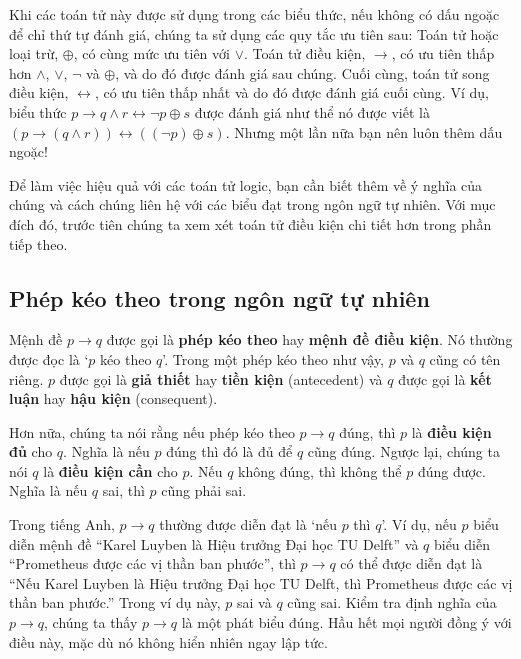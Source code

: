 \begin{infobox}
Khi các toán tử này được sử dụng trong các biểu thức, nếu không có dấu ngoặc để chỉ thứ tự đánh giá, chúng ta sử dụng các quy tắc ưu tiên sau: Toán tử hoặc loại trừ, $\oplus$, có cùng mức ưu tiên với $\lor$. Toán tử điều kiện, $\to$, có ưu tiên thấp hơn $\land$, $\lor$, $\lnot$ và $\oplus$, và do đó được đánh giá sau chúng. Cuối cùng, toán tử song điều kiện, $\leftrightarrow$, có ưu tiên thấp nhất và do đó được đánh giá cuối cùng. Ví dụ, biểu thức $p \to q \land r \leftrightarrow \lnot p \oplus s$ được đánh giá như thể nó được viết là $(p \to (q \land r)) \leftrightarrow ((\lnot p) \oplus s)$. Nhưng một lần nữa bạn nên luôn thêm dấu ngoặc!
\end{infobox}

Để làm việc hiệu quả với các toán tử logic, bạn cần biết thêm về ý nghĩa của chúng và cách chúng liên hệ với các biểu đạt trong ngôn ngữ tự nhiên. Với mục đích đó, trước tiên chúng ta xem xét toán tử điều kiện chi tiết hơn trong phần tiếp theo.

\subsection{Phép kéo theo trong ngôn ngữ tự nhiên}

Mệnh đề $p \to q$ được gọi là \textbf{phép kéo theo} hay \textbf{mệnh đề điều kiện}. Nó thường được đọc là `$p$ kéo theo $q$'. Trong một phép kéo theo như vậy, $p$ và $q$ cũng có tên riêng. $p$ được gọi là \textbf{giả thiết} hay \textbf{tiền kiện} (antecedent) và $q$ được gọi là \textbf{kết luận} hay \textbf{hậu kiện} (consequent).

Hơn nữa, chúng ta nói rằng nếu phép kéo theo $p \to q$ đúng, thì $p$ là \textbf{điều kiện đủ} cho $q$. Nghĩa là nếu $p$ đúng thì đó là đủ để $q$ cũng đúng. Ngược lại, chúng ta nói $q$ là \textbf{điều kiện cần} cho $p$. Nếu $q$ không đúng, thì không thể $p$ đúng được. Nghĩa là nếu $q$ sai, thì $p$ cũng phải sai.

Trong tiếng Anh, $p \to q$ thường được diễn đạt là `nếu $p$ thì $q$'. Ví dụ, nếu $p$ biểu diễn mệnh đề ``Karel Luyben là Hiệu trưởng Đại học TU Delft'' và $q$ biểu diễn ``Prometheus được các vị thần ban phước'', thì $p \to q$ có thể được diễn đạt là ``Nếu Karel Luyben là Hiệu trưởng Đại học TU Delft, thì Prometheus được các vị thần ban phước.'' Trong ví dụ này, $p$ sai và $q$ cũng sai. Kiểm tra định nghĩa của $p \to q$, chúng ta thấy $p \to q$ là một phát biểu đúng. Hầu hết mọi người đồng ý với điều này, mặc dù nó không hiển nhiên ngay lập tức.

